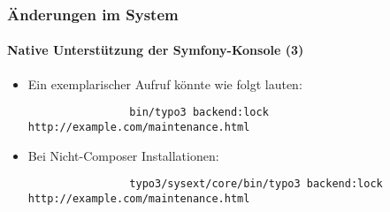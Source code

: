 \begin{frame}[fragile]
	\frametitle{Änderungen im System}
	\framesubtitle{Native Unterstützung der Symfony-Konsole (3)}

	\lstset{basicstyle=\tiny\ttfamily}

	\begin{itemize}

		\item Ein exemplarischer Aufruf könnte wie folgt lauten:
			\begin{lstlisting}
				bin/typo3 backend:lock http://example.com/maintenance.html
			\end{lstlisting}

		\item Bei Nicht-Composer Installationen:
			\begin{lstlisting}
				typo3/sysext/core/bin/typo3 backend:lock http://example.com/maintenance.html
			\end{lstlisting}

	\end{itemize}

\end{frame}


